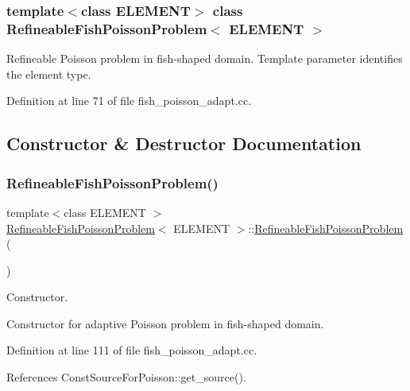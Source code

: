 \subsubsection*{template$<$class E\+L\+E\+M\+E\+NT$>$\newline
class Refineable\+Fish\+Poisson\+Problem$<$ E\+L\+E\+M\+E\+N\+T $>$}

Refineable Poisson problem in fish-\/shaped domain. Template parameter identifies the element type. 

Definition at line 71 of file fish\+\_\+poisson\+\_\+adapt.\+cc.



\subsection{Constructor \& Destructor Documentation}
\mbox{\label{classRefineableFishPoissonProblem_a7a9c8258a867de6b3c8b9d00a7c965f1}} 
\subsubsection{\texorpdfstring{Refineable\+Fish\+Poisson\+Problem()}{RefineableFishPoissonProblem()}\hspace{0.1cm}{\footnotesize\ttfamily [1/2]}}
{\footnotesize\ttfamily template$<$class E\+L\+E\+M\+E\+NT $>$ \\
\hyperlink{classRefineableFishPoissonProblem}{Refineable\+Fish\+Poisson\+Problem}$<$ E\+L\+E\+M\+E\+NT $>$\+::\hyperlink{classRefineableFishPoissonProblem}{Refineable\+Fish\+Poisson\+Problem} (\begin{DoxyParamCaption}{ }\end{DoxyParamCaption})}



Constructor. 

Constructor for adaptive Poisson problem in fish-\/shaped domain. 

Definition at line 111 of file fish\+\_\+poisson\+\_\+adapt.\+cc.



References Const\+Source\+For\+Poisson\+::get\+\_\+source().



